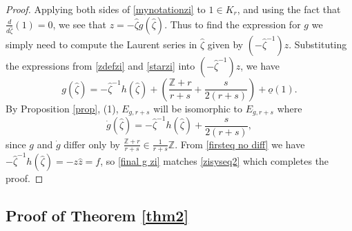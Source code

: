 \documentclass[11pt]{amsart}
\theoremstyle{plain}
\theoremstyle{definition}
\theoremstyle{remark}
\def\z{\hat{\zeta}}
\begin{document}
\begin{proof}
Applying both sides of \eqref{mynotationzi} to $1\in K_r$, and using the fact that $\frac{d}{d\z }(1)=0$, we see that $z=-\z g(\z)$.
 Thus to find the expression for $g$ we simply need to compute the Laurent series in $\z$ given by $(-\z^{-1})z$.  Substituting the expressions from \eqref{zdefzi} and \eqref{starzi} into $(-\z^{-1})z$, we have
\begin{equation*}
    g(\z)=-\z^{-1} h(\z) + \left(\frac{\mathbb{Z}+r}{r+s} +\frac{s}{2(r+s)}\right)+\underline{o}(1).
\end{equation*}  By Proposition \ref{prop}, (1), $E_{g,r+s}$ will be isomorphic to $E_{\dot{g},r+s}$ where
\begin{equation}\label{final g zi}
\dot{g}(\z)=-\z^{-1} h(\z) + \frac{s}{2(r+s)},
\end{equation}
since $g$ and $\dot{g}$ differ only by $\frac{\mathbb{Z}+r}{r+s}\in \frac{1}{r+s}\mathbb{Z}$. From \eqref{firsteq no diff} we have $-\z^{-1} h(\z)=-z\hat{z}=f$, so \eqref{final g zi} matches \eqref{zisyseq2} which completes the proof.
  \end{proof}
  
  
\subsection{Proof of Theorem \ref{thm2}}\label{subsec proof 2}
\end{document}
